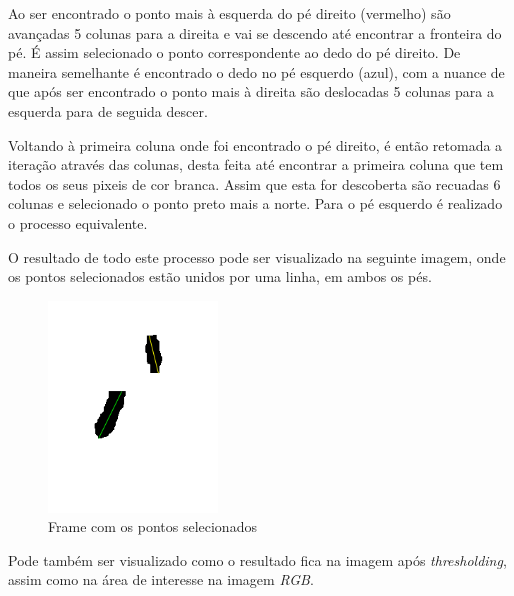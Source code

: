 \documentclass[a4paper]{report}
\begin{document}
 Ao ser encontrado o ponto mais à esquerda do pé direito (vermelho) são avançadas 5 colunas para a
 direita e vai se descendo até encontrar a fronteira do pé. É assim selecionado o ponto correspondente
 ao dedo do pé direito. De maneira semelhante é encontrado o dedo no pé esquerdo (azul), com a nuance
 de que após ser encontrado o ponto mais à direita são deslocadas 5 colunas para a esquerda para de seguida
 descer.
 
 Voltando à primeira coluna onde foi encontrado o pé direito, é então retomada a iteração através das
 colunas, desta feita até encontrar a primeira coluna que tem todos os seus pixeis de cor branca. Assim
 que esta for descoberta são recuadas 6 colunas e selecionado o ponto preto mais a norte. Para o pé
 esquerdo é realizado o processo equivalente.
 
 O resultado de todo este processo pode ser visualizado na seguinte imagem, onde os pontos selecionados
 estão unidos por uma linha, em ambos os pés.


\begin{figure}[H]
    \centering
        \includegraphics[width=0.4\textwidth]{images/building/coords/coordsInitial.png}
        \caption{Frame com os pontos selecionados}
\end{figure}

Pode também ser visualizado como o resultado fica na imagem após \textit{thresholding}, assim como na área de interesse na imagem \textit{RGB}.
\end{document}
